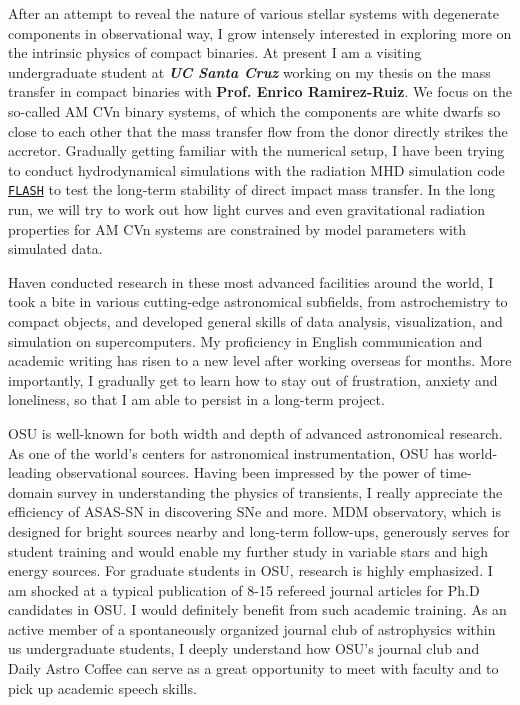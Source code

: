 \documentclass[11pt, a4paper]{awesome-cv} %
\begin{document}
\begin{cvletter}
After an attempt to reveal the nature of various stellar systems with degenerate components in observational way, I grow intensely interested in exploring more on the intrinsic physics of compact binaries. At present I am a visiting undergraduate student at \textbf{\textit{UC Santa Cruz}} working on my thesis on the mass transfer in compact binaries with \textbf{Prof. Enrico Ramirez-Ruiz}. We focus on the so-called AM CVn binary systems, of which the components are white dwarfs so close to each other that the mass transfer flow from the donor directly strikes the accretor. Gradually getting familiar with the numerical setup, I have been trying to conduct hydrodynamical simulations with the radiation MHD simulation code \href{http://flash.uchicago.edu/site/}{\texttt{FLASH}} to test the long-term stability of direct impact mass transfer. In the long run, we will try to work out how light curves and even gravitational radiation properties for AM CVn systems are constrained by model parameters with simulated data.

Haven conducted research in these most advanced facilities around the world, I took a bite in various cutting-edge astronomical subfields, from astrochemistry to compact objects, and developed general skills of data analysis, visualization, and simulation on supercomputers. My proficiency in English communication and academic writing has risen to a new level after working overseas for months. More importantly, I gradually get to learn how to stay out of frustration, anxiety and loneliness, so that I am able to persist in a long-term project.


OSU is well-known for both width and depth of advanced astronomical research. As one of the world's centers for astronomical instrumentation, OSU has world-leading observational sources. Having been impressed by the power of time-domain survey in understanding the physics of transients, I really appreciate the efficiency of ASAS-SN in discovering SNe and more. MDM observatory, which is designed for bright sources nearby and long-term follow-ups, generously serves for student training and would enable my further study in variable stars and high energy sources. For graduate students in OSU, research is highly emphasized. I am shocked at a typical publication of 8-15 refereed journal articles for Ph.D candidates in OSU. I would definitely benefit from such academic training. As an active member of a spontaneously organized journal club of astrophysics within us undergraduate students, I deeply understand how OSU's journal club and Daily Astro Coffee can serve as a great opportunity to meet with faculty and to pick up academic speech skills.


\end{cvletter}
\end{document}
